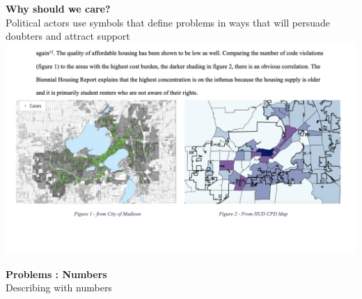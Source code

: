 \documentclass[aspectratio=169]{beamer}
\theoremstyle{principle}
\begin{document}
\begin{frame}

\begin{center}
\Huge\textbf{Why should we care?}\\
\bigskip
\bigskip
\large Political actors use symbols that define problems in ways that will persuade doubters and attract support\\
\includegraphics[scale=0.2]{maps.png}
\end{center}

\end{frame}



\begin{frame}

\begin{center}
\Huge\textbf{Problems : Numbers}\\
\bigskip
\bigskip
\large Describing with numbers
\end{center}

\end{frame}
\end{document}
